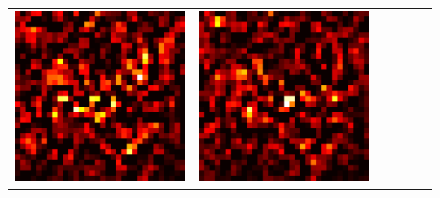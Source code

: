 \documentclass[preprint,12pt]{elsarticle}
\begin{document}
\begin{figure}[p]
\begin{tabular}{cccccc}
  \includegraphics[scale=\scale]{../visualizations/examples/cifar10/resnet18/positive_saliency_map/0.png} & 
  \includegraphics[scale=\scale]{../visualizations/examples/cifar10/resnet18/negative_saliency_map/0.png} & 

\end{tabular}
\end{figure}
\end{document}

